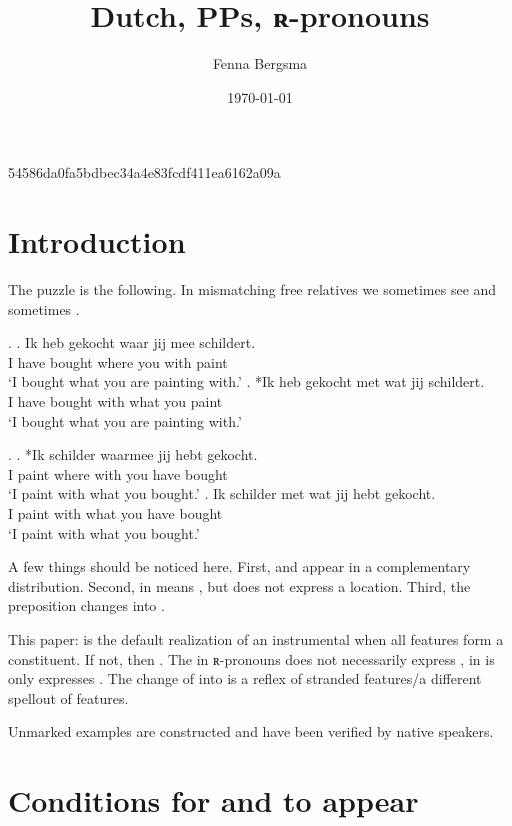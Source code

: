 \documentclass{article}
\title{Dutch, PPs, ʀ-pronouns}
\author{Fenna Bergsma}
\date{\today}
\begin{document}
\maketitle


54586da0fa5bdbec34a4e83fcdf411ea6162a09a

\section{Introduction}

The puzzle is the following. In mismatching free relatives we sometimes see  and sometimes .

\ex.
\ag. Ik heb gekocht waar jij mee schildert.\\
 I have bought where you with paint\\
 `I bought what you are painting with.'
\bg. *Ik heb gekocht met wat jij schildert.\\
 I have bought with what you paint\\
 `I bought what you are painting with.'

\ex.
\ag. *Ik schilder waarmee jij hebt gekocht.\\
 I paint {where with} you have bought\\
 `I paint with what you bought.'
\bg. Ik schilder met wat jij hebt gekocht.\\
 I paint with what you have bought\\
 `I paint with what you bought.'

A few things should be noticed here. First,  and  appear in a complementary distribution. Second,  in  means , but  does not express a location. Third, the preposition  changes into .

This paper:  is the default realization of an instrumental when all features form a constituent. If not, then . The  in ʀ-pronouns does not necessarily express , in  is only expresses . The change of  into  is a reflex of stranded features/a different spellout of features.

Unmarked examples are constructed and have been verified by native speakers.



\section{Conditions for  and  to appear}
\end{document}
